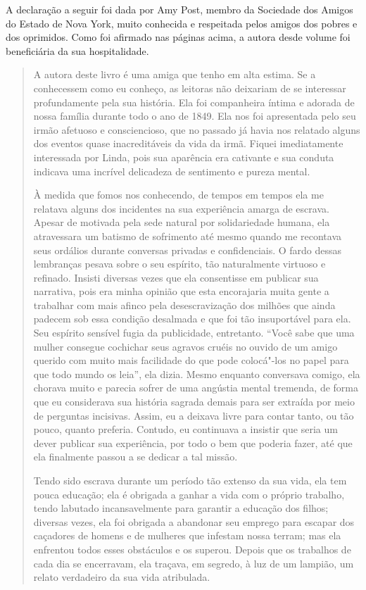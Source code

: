 \noindent{}A declaração a seguir foi dada por Amy
Post, membro da Sociedade dos Amigos do Estado de Nova York, muito
conhecida e respeitada pelos amigos dos pobres e dos oprimidos. Como foi
afirmado nas páginas acima, a autora desde volume foi beneficiária da
sua hospitalidade.

\begin{quote}
A autora deste livro é uma amiga que
tenho em alta estima. Se a conhecessem como eu conheço, as leitoras não
deixariam de se interessar profundamente pela sua história. Ela foi
companheira íntima e adorada de nossa família durante todo o ano de
1849. Ela nos foi apresentada pelo seu irmão afetuoso e consciencioso,
que no passado já havia nos relatado alguns dos eventos quase
inacreditáveis da vida da irmã. Fiquei imediatamente interessada por
Linda, pois sua aparência era cativante e sua conduta indicava uma
incrível delicadeza de sentimento e pureza mental.

À medida que fomos nos conhecendo, de
tempos em tempos ela me relatava alguns dos incidentes na sua
experiência amarga de escrava. Apesar de motivada pela sede natural por
solidariedade humana, ela atravessara um batismo de sofrimento até mesmo
quando me recontava seus ordálios durante conversas privadas e
confidenciais. O fardo dessas lembranças pesava sobre o seu espírito,
tão naturalmente virtuoso e refinado. Insisti diversas vezes que ela
consentisse em publicar sua narrativa, pois era minha opinião que esta
encorajaria muita gente a trabalhar com mais afinco pela desescravização
dos milhões que ainda padecem sob essa condição desalmada e que foi tão
insuportável para ela. Seu espírito sensível fugia da publicidade,
entretanto. ``Você sabe que uma mulher consegue cochichar seus agravos
cruéis no ouvido de um amigo querido com muito mais facilidade do que
pode colocá"-los no papel para que todo mundo os leia'', ela dizia. Mesmo
enquanto conversava comigo, ela chorava muito e parecia sofrer de uma
angústia mental tremenda, de forma que eu considerava sua história
sagrada demais para ser extraída por meio de perguntas incisivas. Assim,
eu a deixava livre para contar tanto, ou tão pouco, quanto preferia.
Contudo, eu continuava a insistir que seria um dever publicar sua
experiência, por todo o bem que poderia fazer, até que ela finalmente
passou a se dedicar a tal missão.

Tendo sido escrava durante um período
tão extenso da sua vida, ela tem pouca educação; ela é obrigada a ganhar
a vida com o próprio trabalho, tendo labutado incansavelmente para
garantir a educação dos filhos; diversas vezes, ela foi obrigada a
abandonar seu emprego para escapar dos caçadores de homens e de mulheres
que infestam nossa terram; mas ela enfrentou todos esses obstáculos e os
superou. Depois que os trabalhos de cada dia se encerravam, ela traçava,
em segredo, à luz de um lampião, um relato verdadeiro da sua vida
atribulada.


\end{quote}
